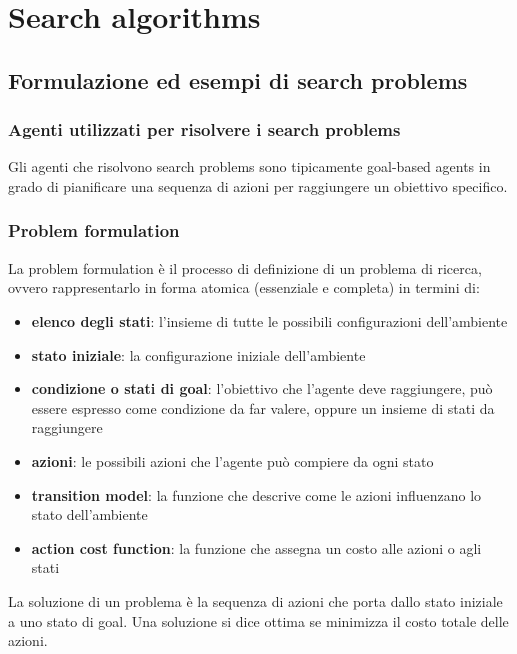 \section{Search algorithms}
\subsection{Formulazione ed esempi di search problems}
\subsubsection*{Agenti utilizzati per risolvere i search problems}
Gli agenti che risolvono search problems sono tipicamente goal-based agents in grado di pianificare una sequenza di azioni
per raggiungere un obiettivo specifico.

\subsubsection*{Problem formulation}
La problem formulation è il processo di definizione di un problema di ricerca, ovvero rappresentarlo in forma atomica (essenziale
e completa) in termini di:
\begin{itemize}
	\item \textbf{elenco degli stati}: l'insieme di tutte le possibili configurazioni dell'ambiente
	\item \textbf{stato iniziale}: la configurazione iniziale dell'ambiente
	\item \textbf{condizione o stati di goal}: l'obiettivo che l'agente deve raggiungere, può essere espresso come condizione
	da far valere, oppure un insieme di stati da raggiungere
	\item \textbf{azioni}: le possibili azioni che l'agente può compiere da ogni stato
	\item \textbf{transition model}: la funzione che descrive come le azioni influenzano lo stato dell'ambiente
	\item \textbf{action cost function}: la funzione che assegna un costo alle azioni o agli stati
\end{itemize}
La soluzione di un problema è la sequenza di azioni che porta dallo stato iniziale a uno stato di goal. Una soluzione
si dice ottima se minimizza il costo totale delle azioni.

